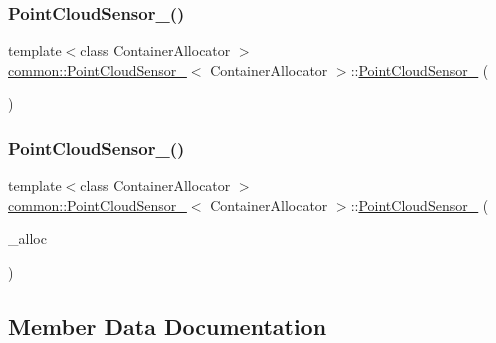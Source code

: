 \subsubsection{\texorpdfstring{Point\+Cloud\+Sensor\+\_\+()}{PointCloudSensor\_()}\hspace{0.1cm}{\footnotesize\ttfamily [1/2]}}
{\footnotesize\ttfamily template$<$class Container\+Allocator $>$ \\
\hyperlink{structcommon_1_1PointCloudSensor__}{common\+::\+Point\+Cloud\+Sensor\+\_\+}$<$ Container\+Allocator $>$\+::\hyperlink{structcommon_1_1PointCloudSensor__}{Point\+Cloud\+Sensor\+\_\+} (\begin{DoxyParamCaption}{ }\end{DoxyParamCaption})\hspace{0.3cm}{\ttfamily [inline]}}

\mbox{\label{structcommon_1_1PointCloudSensor___a2857de8ba28bbb8b22394120412690f0}} 
\subsubsection{\texorpdfstring{Point\+Cloud\+Sensor\+\_\+()}{PointCloudSensor\_()}\hspace{0.1cm}{\footnotesize\ttfamily [2/2]}}
{\footnotesize\ttfamily template$<$class Container\+Allocator $>$ \\
\hyperlink{structcommon_1_1PointCloudSensor__}{common\+::\+Point\+Cloud\+Sensor\+\_\+}$<$ Container\+Allocator $>$\+::\hyperlink{structcommon_1_1PointCloudSensor__}{Point\+Cloud\+Sensor\+\_\+} (\begin{DoxyParamCaption}\item[{const Container\+Allocator \&}]{\+\_\+alloc }\end{DoxyParamCaption})\hspace{0.3cm}{\ttfamily [inline]}}



\subsection{Member Data Documentation}
\mbox{\label{structcommon_1_1PointCloudSensor___a319b30587d49d43738617049eae23202}} 
